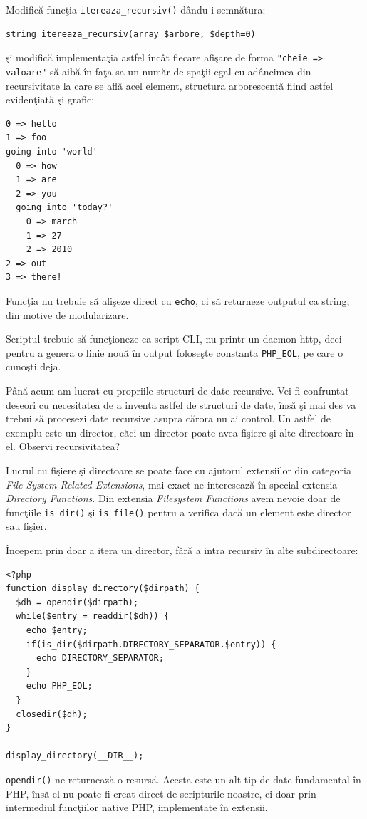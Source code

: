 \begin{Exercise}[title={Adâncimea recursivităţii},difficulty=2]
Modifică funcţia \texttt{itereaza\_recursiv()} dându-i semnătura:
\begin{verbatim}
string itereaza_recursiv(array $arbore, $depth=0)
\end{verbatim}
şi modifică implementaţia astfel încât fiecare afişare
de forma \texttt{"cheie => valoare"} să aibă în faţa sa
un număr de spaţii egal cu adâncimea din recursivitate la care
se află acel element, structura arborescentă fiind
astfel evidenţiată şi grafic:
\begin{verbatim}
0 => hello
1 => foo
going into 'world'
  0 => how
  1 => are
  2 => you
  going into 'today?'
    0 => march
    1 => 27
    2 => 2010
2 => out
3 => there!
\end{verbatim}
Funcţia nu trebuie să afişeze direct cu \texttt{echo},
ci să returneze outputul ca string, din motive
de modularizare.

Scriptul trebuie să funcţioneze ca script CLI,
nu printr-un daemon http, deci pentru a genera
o linie nouă în output foloseşte constanta
\texttt{PHP\_EOL}, pe care o cunoşti deja.
\end{Exercise}

Până acum am lucrat cu propriile structuri de date
recursive. Vei fi confruntat deseori cu necesitatea
de a inventa astfel de structuri de date, însă
şi mai des va trebui să procesezi date recursive
asupra cărora nu ai control. Un astfel
de exemplu este un director, căci un director poate avea
fişiere şi alte directoare în el. Observi recursivitatea?

Lucrul cu fişiere şi directoare se poate face
cu ajutorul extensiilor din categoria
\textit{File System Related Extensions}, mai exact
ne interesează în special extensia \textit{Directory Functions}.
Din extensia \textit{Filesystem Functions} avem nevoie
doar de funcţiile \texttt{is\_dir()} şi \texttt{is\_file()}
pentru a verifica dacă un element este director sau
fişier.

Începem prin doar a itera un director, fără
a intra recursiv în alte subdirectoare:

\begin{lstlisting}
<?php
function display_directory($dirpath) {
  $dh = opendir($dirpath);
  while($entry = readdir($dh)) {
	echo $entry;
	if(is_dir($dirpath.DIRECTORY_SEPARATOR.$entry)) {
	  echo DIRECTORY_SEPARATOR;
	}
	echo PHP_EOL;
  }
  closedir($dh);
}

display_directory(__DIR__);
\end{lstlisting}
\texttt{opendir()} ne returnează o resursă. Acesta este
un alt tip de date fundamental în PHP, însă
el nu poate fi creat direct de scripturile noastre,
ci doar prin intermediul funcţiilor native PHP,
implementate în extensii.

